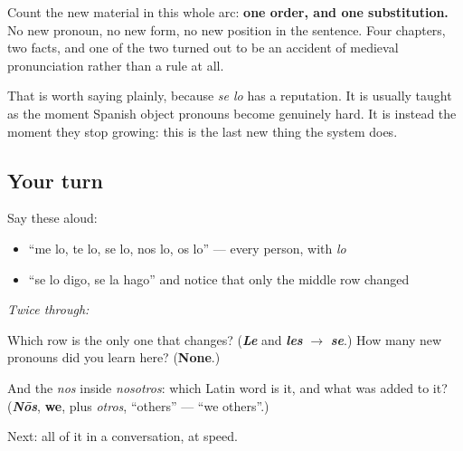 \begin{grammarlens}[title={Grammar Lens: how little is actually new}]
Count the new material in this whole arc: \textbf{one order, and one substitution.} No new pronoun, no new form, no new position in the sentence. Four chapters, two facts, and one of the two turned out to be an accident of medieval pronunciation rather than a rule at all.

That is worth saying plainly, because \emph{se lo} has a reputation. It is usually taught as the moment Spanish object pronouns become genuinely hard. It is instead the moment they stop growing: this is the last new thing the system does.
\end{grammarlens}

\subsection*{Your turn}
Say these aloud:

\begin{itemize}
\raggedright
  \item \textquotedblleft{}me lo, te lo, se lo, nos lo, os lo\textquotedblright{} — every person, with \emph{lo}
  \item \textquotedblleft{}se lo digo, se la hago\textquotedblright{} and notice that only the middle row changed
\end{itemize}

\emph{Twice through:}

\begin{tcolorbox}[breakable,colback=teal!4,colframe=teal!35!black,title={Before you move on}]
Which row is the only one that changes? (\emph{\textbf{Le}} and \emph{\textbf{les}} $\to$ \emph{\textbf{se}}.) How many new pronouns did you learn here? (\textbf{None}.)

And the \emph{nos} inside \emph{nosotros}: which Latin word is it, and what was added to it? (\emph{\textbf{Nōs}}, \textbf{we}, plus \emph{otros}, \textquotedblleft{}others\textquotedblright{} — \textquotedblleft{}we others\textquotedblright{}.)

Next: all of it in a conversation, at speed.
\end{tcolorbox}
